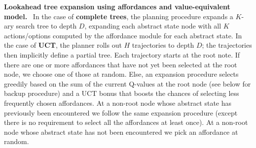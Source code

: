 \documentclass[nohyperref]{article}
\theoremstyle{plain}
\theoremstyle{definition}
\theoremstyle{remark}
\renewcommand{\paragraph}[1]{\textbf{#1}\ }
\begin{document}
\paragraph{Lookahead tree expansion using affordances and value-equivalent model.}
In the case of \textbf{complete trees}, the planning procedure expands a $K$-ary search tree to depth $D$,
expanding each abstract state node with all $K$ actions/options computed by the affordance module for each abstract state. In the case of \textbf{UCT}, the planner rolls out $H$ trajectories to depth $D$; the trajectories then implicitly define a partial tree. Each trajectory starts at the root note. If there are one or more affordances that have not yet been selected at the root node, we choose one of those at random. Else, an expansion procedure selects greedily based on the sum of the current Q-values at the root node (see below for backup procedure) and a UCT bonus that boosts the chances of selecting less frequently chosen affordances. At a non-root node whose abstract state has previously been encountered we follow the same expansion procedure (except there is no requirement to select all the affordances at least once). At a non-root node whose abstract state has not been encountered  we pick an affordance at random. 

\end{document}
